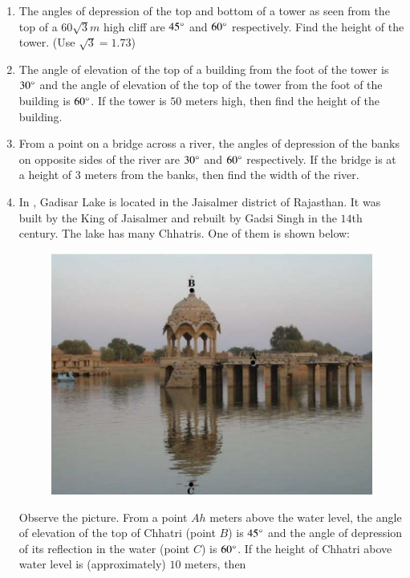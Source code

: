 \begin{enumerate}[label=\thesubsection.\arabic*.,ref=\thesubsection.\theenumi]
\begin{figure}[H]
        \caption{}
        \label{fig:as.jpeg}
    \end{figure}
    \hfill{}
\item The angles of depression of the top and bottom of a tower as seen from the top of a $60\sqrt{3}m$ high cliff are $45\degree$ and $60\degree$ respectively. Find the height of the tower. (Use $\sqrt{3}=1.73$)
    \hfill{}\item The angle of elevation of the top of a building from the foot of the tower is $30\degree$ and the angle of elevation of the top of the tower from the foot of the building is $60\degree$. If the tower is $50$ meters high, then find the height of the building.
    \hfill{}\item From a point on a bridge across a river, the angles of depression of the banks on opposite sides of the river are $30\degree$ and $60\degree$ respectively. If the bridge is at a height of $3$ meters from the banks, then find the width of the river. 
    \hfill{}\item In , Gadisar Lake is located in the Jaisalmer district of Rajasthan. It was built by the King of Jaisalmer and rebuilt by Gadsi Singh in the $14$th century. The lake has many Chhatris. One of them is shown below:
    \begin{figure}[H]
        \centering
    	 \includegraphics[width=\columnwidth]{cbse/figs/ak.jpeg}
        \caption{}
        \label{fig:ak}
    \end{figure}
    Observe the picture. From a point $Ah$ meters above the water level, the angle of elevation of the top of Chhatri (point $B$) is $45\degree$ and the angle of depression of its reflection in the water (point $C$) is $60\degree$. If the height of Chhatri above water level is (approximately) $10$ meters, then 

\end{enumerate}

